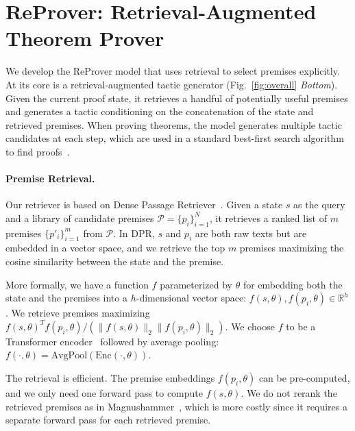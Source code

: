 \documentclass{article}
\newcommand{\smallsec}[1]{\vspace{-1mm} \paragraph{#1.}}
\newcommand\name{ReProver}
\begin{document}


\section{{\name}: Retrieval-Augmented Theorem Prover}
\label{sec:reprover}


We develop the {\name} model that uses retrieval to select premises explicitly. At its core is a retrieval-augmented tactic generator (Fig.~\ref{fig:overall} \emph{Bottom}). Given the current proof state, it retrieves a handful of potentially useful premises and generates a tactic conditioning on the concatenation of the state and retrieved premises. When proving theorems, the model generates multiple tactic candidates at each step, which are used in a standard best-first search algorithm to find proofs~\cite{han2022proof,zheng2022minif2f,polu2023formal,jiang2022thor}. 


\smallsec{Premise Retrieval}
Our retriever is based on Dense Passage Retriever~\cite{karpukhin2020dense}. Given a state $s$ as the query and a library of candidate premises $\mathcal{P} = \{p_i\}_{i=1}^{N}$, it retrieves a ranked list of $m$ premises $\{p'_i\}_{i=1}^{m}$ from $\mathcal{P}$. In DPR, $s$ and $p_i$ are both raw texts but are embedded in a vector space, and we retrieve the top $m$ premises maximizing the cosine similarity between the state and the premise.

More formally, we have a function $f$ parameterized by $\theta$ for embedding both the state and the premises into a $h$-dimensional vector space: $f(s, \theta), f(p_i, \theta) \in \mathbb{R}^{h}$. We retrieve premises maximizing $f(s, \theta)^T f(p_i, \theta)/(\lVert f(s, \theta) \rVert_2 \lVert f(p_i, \theta) \rVert_2)$. We choose $f$ to be a Transformer encoder~\cite{vaswani2017attention} followed by average pooling: $f(\cdot, \theta) = \textrm{AvgPool}(\textrm{Enc}(\cdot, \theta))$.

The retrieval is efficient. The premise embeddings $f(p_i, \theta)$ can be pre-computed, and we only need one forward pass to compute $f(s, \theta)$. We do not rerank the retrieved premises as in Magnushammer~\cite{mikula2023magnushammer}, which is more costly since it requires a separate forward pass for each retrieved premise.
\end{document}

